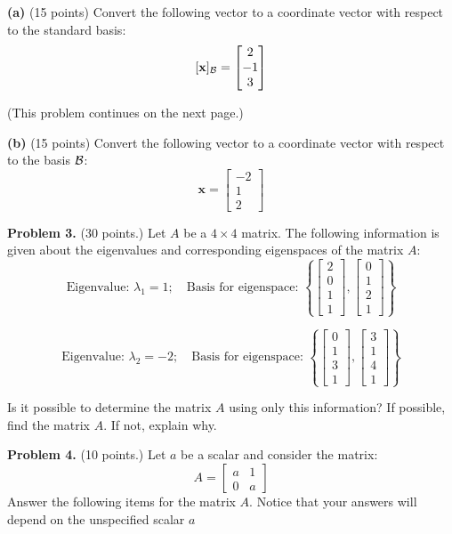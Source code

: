 \documentclass[12pt]{article}
\begin{document}
\textbf{(a)} (15 points) Convert the following vector to a coordinate vector with respect to the standard basis: 
\[
[\mathbf{x}]_{\cal B}=\begin{bmatrix}2\\-1\\3\end{bmatrix}
\]

\vfill
(This problem continues on the next page.)
\clearpage

\textbf{(b)} (15 points) Convert the following vector to a coordinate vector with respect to the basis ${\cal B}$:
\[
\mathbf{x}=\begin{bmatrix}-2\\1\\2\end{bmatrix}
\]
\clearpage

\textbf{Problem 3.} (30 points.) Let $A$ be a $4\times 4$ matrix. The following information is given about the eigenvalues and corresponding eigenspaces of the matrix $A$:
\[
\text{Eigenvalue: }\lambda_1=1;\quad
\text{Basis for eigenspace: } \left\{\begin{bmatrix} 2\\ 0\\ 1\\ 1\end{bmatrix},
\begin{bmatrix} 0\\ 1\\ 2\\ 1\end{bmatrix}\right\}
\]

\[
\text{Eigenvalue: }\lambda_2=-2;\quad
\text{Basis for eigenspace: } \left\{\begin{bmatrix} 0\\ 1\\ 3\\ 1\end{bmatrix},
\begin{bmatrix} 3\\ 1\\ 4\\ 1\end{bmatrix}\right\}
\]

Is it possible to determine the matrix $A$ using only this information? If possible, find the matrix $A$. If not, explain why.

\clearpage

\textbf{Problem 4.} (10 points.) Let $a$ be a scalar and consider the matrix:
\[
A = \begin{bmatrix}a&1\\0&a\end{bmatrix}
\]
Answer the following items for the matrix $A$. Notice that your answers will depend on the unspecified scalar $a$
\end{document}
